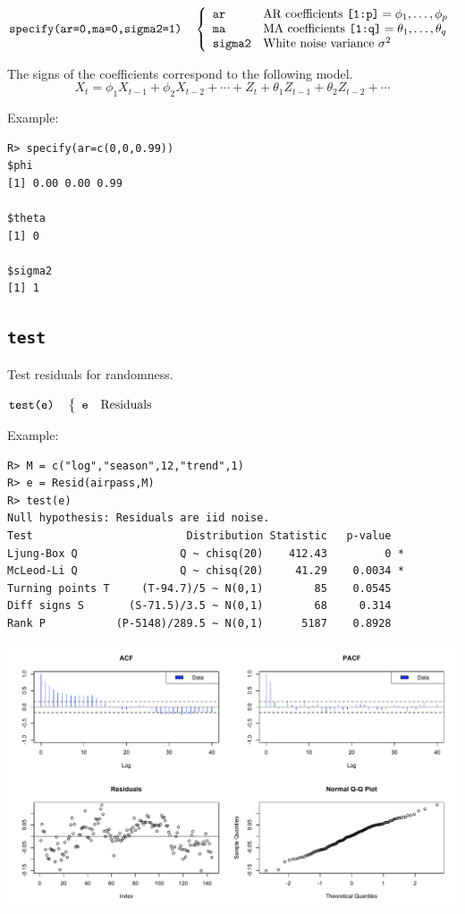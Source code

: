 \documentclass[12pt]{article}
\begin{document}
\bigskip
$
\hbox{\tt specify(ar=0,ma=0,sigma2=1)}\quad\left\{\begin{array}{ll}
{\tt ar} & \hbox{AR coefficients \tt[1:p]}=\phi_1,\ldots,\phi_p\\
{\tt ma} & \hbox{MA coefficients \tt[1:q]}=\theta_1,\ldots,\theta_q\\
{\tt sigma2} & \hbox{White noise variance $\sigma^2$}
\end{array}\right.
$

\bigskip
\noindent
The signs of the coefficients correspond to the following model.
\[
X_t=\phi_1X_{t-1}+\phi_2X_{t-2}+\cdots+Z_t+\theta_1Z_{t-1}+\theta_2Z_{t-2}+\cdots
\]

\noindent
Example:

\begin{verbatim}
R> specify(ar=c(0,0,0.99))
$phi
[1] 0.00 0.00 0.99

$theta
[1] 0

$sigma2
[1] 1
\end{verbatim}

\newpage

\subsection{\tt test}
Test residuals for randomness.

\bigskip
$
\hbox{\tt test(e)}\quad\left\{\begin{array}{ll}
{\tt e} & \hbox{Residuals}
\end{array}\right.
$

\bigskip
\noindent
Example:

\begin{verbatim}
R> M = c("log","season",12,"trend",1)
R> e = Resid(airpass,M)
R> test(e)
Null hypothesis: Residuals are iid noise.
Test                        Distribution Statistic   p-value
Ljung-Box Q                Q ~ chisq(20)    412.43         0 *
McLeod-Li Q                Q ~ chisq(20)     41.29    0.0034 *
Turning points T     (T-94.7)/5 ~ N(0,1)        85    0.0545
Diff signs S       (S-71.5)/3.5 ~ N(0,1)        68     0.314
Rank P           (P-5148)/289.5 ~ N(0,1)      5187    0.8928
\end{verbatim}

\begin{center}
\includegraphics[scale=0.4]{Rplot-33.pdf}
\end{center}
\end{document}
